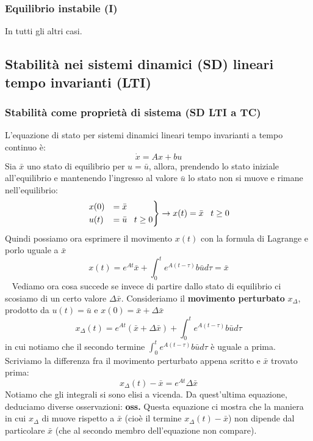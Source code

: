 \subsubsection{Equilibrio instabile (I)}
In tutti gli altri casi.
\subsection{Stabilità nei sistemi dinamici (SD) lineari tempo invarianti (LTI)}
\subsubsection{Stabilità come proprietà di sistema (SD LTI a TC)}
L'equazione di stato per sistemi dinamici lineari tempo invarianti a tempo continuo è:
\[
    \dot{x} = Ax + bu
\]
Sia $\bar{x}$ uno stato di equilibrio per $u = \bar{u}$, allora, prendendo lo stato iniziale all'equilibrio e mantenendo l'ingresso al valore $\bar{u}$ lo stato non si muove e rimane nell'equilibrio:
\[
    \begin{rcases}
        x(0) &= \bar{x}\\
        u(t) &= \bar{u} \;\;\; t\geq 0
    \end{rcases} \rightarrow  x(t) = \bar{x} \;\;\;t \geq 0
\]
Quindi possiamo ora esprimere il movimento $x(t)$ con la formula di Lagrange e porlo uguale a $\bar{x}$
\[
    x(t) = e^{At} \bar{x} + \int_{0}^{t}e^{A(t-\tau)} b \bar{u} d \tau = \bar{x}
\]
\ \newline 
Vediamo ora cosa succede se invece di partire dallo stato di equilibrio ci scosiamo di un certo valore $\Delta \bar{x}$. Consideriamo il \textbf{movimento perturbato} $x_{\Delta}$, prodotto da $u(t) = \bar{u}$ e $x(0) = \bar{x} + \Delta \bar{x}$
\[
    x_{\Delta}(t) = e^{At}(\bar{x} + \Delta \bar{x}) + \int_{0}^{t}e^{A(t- \tau)}b \bar{u} d \tau
\]
in cui notiamo che il secondo termine $\int_{0}^{t}e^{A(t- \tau)}b \bar{u} d \tau$ è uguale a prima.\newline
\newline
Scriviamo la differenza fra il movimento perturbato appena scritto e $\bar{x}$ trovato prima:
\[
    x_\Delta (t) - \bar{x} = e^{At} \Delta \bar{x}
\]
Notiamo che gli integrali si sono elisi a vicenda.\newline
\newline
Da quest'ultima equazione, deduciamo diverse osservazioni:\newline
\newline
\textbf{oss.} Questa equazione ci mostra che la maniera in cui $x_\Delta$ di muove rispetto a $\bar{x}$ (cioè il termine $x_\Delta (t) - \bar{x}$) non dipende dal particolare $\bar{x}$ (che al secondo membro dell'equazione non compare).\newline
